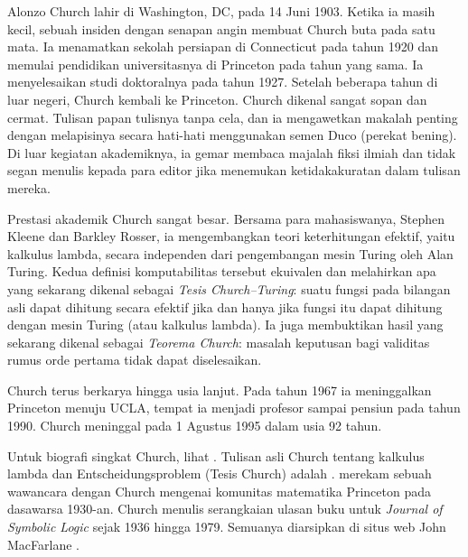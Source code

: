 \documentclass[../../../include/open-logic-section]{subfiles}
\begin{document}



Alonzo Church lahir di Washington, DC, pada 14 Juni 1903. Ketika ia masih
kecil, sebuah insiden dengan senapan angin membuat Church buta pada satu
mata. Ia menamatkan sekolah persiapan di Connecticut pada tahun 1920 dan
memulai pendidikan universitasnya di Princeton pada tahun yang sama. Ia
menyelesaikan studi doktoralnya pada tahun 1927. Setelah beberapa tahun di
luar negeri, Church kembali ke Princeton. Church dikenal sangat sopan dan
cermat. Tulisan papan tulisnya tanpa cela, dan ia mengawetkan makalah penting
dengan melapisinya secara hati-hati menggunakan semen Duco (perekat bening).
Di luar kegiatan akademiknya, ia gemar membaca majalah fiksi ilmiah dan
tidak segan menulis kepada para editor jika menemukan ketidakakuratan dalam
tulisan mereka.

Prestasi akademik Church sangat besar. Bersama para mahasiswanya, Stephen
Kleene dan Barkley Rosser, ia mengembangkan teori keterhitungan efektif,
yaitu kalkulus lambda, secara independen dari pengembangan mesin Turing oleh
Alan Turing. Kedua definisi komputabilitas tersebut ekuivalen dan melahirkan
apa yang sekarang dikenal sebagai \emph{Tesis Church--Turing}: suatu fungsi
pada bilangan asli dapat dihitung secara efektif jika dan hanya jika fungsi
itu dapat dihitung dengan mesin Turing (atau kalkulus lambda). Ia juga
membuktikan hasil yang sekarang dikenal sebagai \emph{Teorema Church}:
masalah keputusan bagi validitas rumus orde pertama tidak dapat diselesaikan.

Church terus berkarya hingga usia lanjut. Pada tahun 1967 ia meninggalkan
Princeton menuju UCLA, tempat ia menjadi profesor sampai pensiun pada tahun
1990. Church meninggal pada 1 Agustus 1995 dalam usia 92 tahun.

\begin{reading}
Untuk biografi singkat Church, lihat \citet{EndertonND}. Tulisan asli Church
tentang kalkulus lambda dan Entscheidungsproblem (Tesis Church) adalah
\citet{Church1936,Church1936a}. \citet{Aspray1984} merekam sebuah wawancara
dengan Church mengenai komunitas matematika Princeton pada dasawarsa 1930-an.
Church menulis serangkaian ulasan buku untuk \emph{Journal of Symbolic Logic}
sejak 1936 hingga 1979. Semuanya diarsipkan di situs web John MacFarlane
\citep{MacFarlane2015}.
\end{reading}
\end{document}
